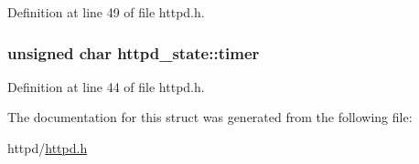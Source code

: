 Definition at line 49 of file httpd.h.

\hypertarget{structhttpd__state_ac39694ece9526b84012f90f2bb00af9f}{
\subsubsection[{timer}]{\setlength{\rightskip}{0pt plus 5cm}unsigned char {\bf httpd\_\-state::timer}}}
\label{structhttpd__state_ac39694ece9526b84012f90f2bb00af9f}


Definition at line 44 of file httpd.h.



The documentation for this struct was generated from the following file:\begin{DoxyCompactItemize}
\item 
httpd/\hyperlink{httpd_8h}{httpd.h}\end{DoxyCompactItemize}
